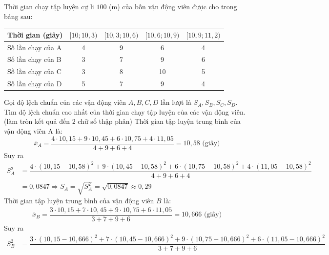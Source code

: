 \begin{ex}%
	Thời gian chạy tập luyện cự li $100$ (m) của bốn vận động viên được cho trong bảng sau:
	\begin{center}
		\begin{tabular}{|l|c|c|c|c|}
			\hline Thời gian (giây) & {$[10 ; 10,3)$} & {$[10,3 ; 10,6)$} & {$[10,6 ; 10,9)$} & {$[10,9 ; 11,2)$} \\
			\hline Số lần chạy của A & 4 & 9 & 6 & 4 \\
			\hline Số lần chạy của B & 3 & 7 & 9 & 6 \\
			\hline Sồ lần chạy của C & 3 & 8 & 10 & 5 \\
			\hline Số lần chạy của D & 5 & 7 & 9 & 4 \\
			\hline
		\end{tabular}
	\end{center}
	Gọi độ lệch chuẩn của các vận động viên $A, B, C, D$ lần lượt là ${S}_{{A}}, {S}_{B}, {S}_{C}, {S}_{{D}}$. Tìm độ lệch chuẩn cao nhất của thời gian chạy tập luyện của các vận động viên. (làm tròn kết quả đến 2 chữ số thập phân)
	\loigiai
	{Thời gian tập luyện trung bình của vận động viên A là:
		$$\overline{{x}}_{A}=\dfrac{4 \cdot 10,15+9 \cdot 10,45+6 \cdot 10,75+4 \cdot 11,05}{4+9+6+4}=10,58 \text{ (giây)}$$
		Suy ra
		\begin{align*}
			{S}_{{A}}^{2}&=\dfrac{4 \cdot(10,15-10,58)^{2}+9 \cdot(10,45-10,58)^{2}+6 \cdot(10,75-10,58)^{2}+4 \cdot(11,05-10,58)^{2}}{4+9+6+4} \\
			&=0,0847 \Rightarrow {S}_{{A}}=\sqrt{{S}_{{A}}^{2}}=\sqrt{0,0847} \approx 0,29
		\end{align*}
		Thời gian tập luyện trung bình của vận động viên $B$ là:
		\begin{align*}
			\overline{{x}}_{B}=\dfrac{3 \cdot 10,15+7 \cdot 10,45+9 \cdot 10,75+6 \cdot 11,05}{3+7+9+6}=10,666 \text{ (giây)}
		\end{align*}
		Suy ra
		\begin{align*}
			{S}_{{B}}^{2} & =\dfrac{3 \cdot(10,15-10,666)^{2}+7 \cdot(10,45-10,666)^{2}+9 \cdot(10,75-10,666)^{2}+6 \cdot(11,05-10,666)^{2}}{3+7+9+6} \\

\end{align*}}
\end{ex}
